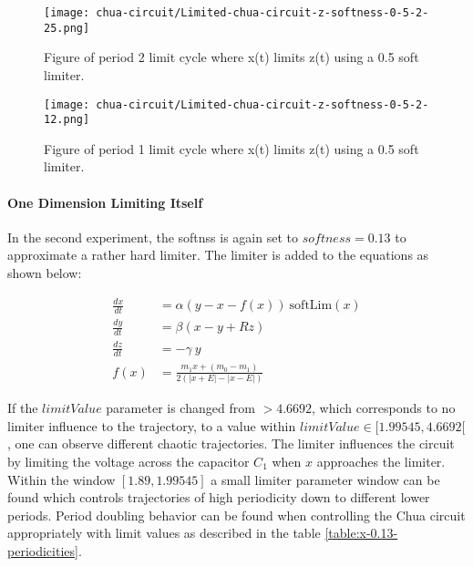 \documentclass[main]{subfiles}
\begin{document}
\begin{figure}[H]
\centering
\texttt{[image: chua-circuit/Limited-chua-circuit-z-softness-0-5-2-25.png]}
\caption[Figure of period 2 limit cycle using a 0.5 soft limiter.]{Figure of period 2 limit cycle where x(t) limits z(t) using a 0.5 soft limiter.}
\label{figure:z-0.5-2-limit-cycle-trajectory}
\end{figure}

\begin{figure}[H]
\centering
\texttt{[image: chua-circuit/Limited-chua-circuit-z-softness-0-5-2-12.png]}
\caption[Figure of period 1 limit cycle using a 0.5 soft limiter.]{Figure of period 1 limit cycle where x(t) limits z(t) using a 0.5 soft limiter.}
\label{figure:z-0.5-1-limit-cycle-trajectory}
\end{figure}

\paragraph{One Dimension Limiting Itself} In the second experiment, the softnss is again set to \(softness=0.13\) to approximate a rather hard limiter. The limiter is added to the equations as shown below:

\begin{align*}
\frac{dx}{dt}&=\alpha (y-x-f(x)) ~ \text{softLim}(x)\\
\frac{dy}{dt}&=\beta (x-y + Rz)\\
\frac{dz}{dt}&=-\gamma ~ y\\
f (x) &= \frac{m_1 x + (m_0 - m_1)}{2 (| x + E | -| x - E |)}
\end{align*}

If the $limitValue$ parameter is changed from \(>4.6692\), which corresponds to no limiter influence to the trajectory, to a value within \(limitValue \in [1.99545,4.6692[\), one can observe different chaotic trajectories. The limiter influences the circuit by limiting the voltage across the capacitor \(C_1\) when \(x\) approaches the limiter. %
%
Within the window \([1.89,1.99545]\) a small limiter parameter window can be found which controls trajectories of high periodicity down to different lower periods. %
%
Period doubling behavior can be found when controlling the Chua circuit appropriately with limit values as described in the table \ref{table:x-0.13-periodicities}.
\end{document}
